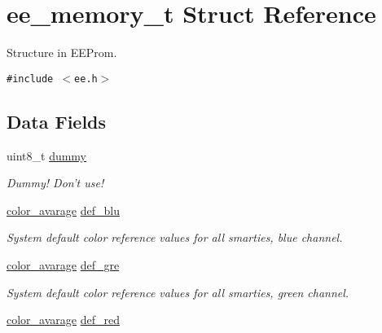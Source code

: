 \hypertarget{structee__memory__t}{
\section{ee\_\-memory\_\-t Struct Reference}
\label{structee__memory__t}
}
Structure in EEProm.  


{\tt \#include $<$ee.h$>$}

\subsection*{Data Fields}
\begin{CompactItemize}
\item 
\hypertarget{structee__memory__t_c1eda51e24a2d4f4e89ee1b89b4f78f6}{
uint8\_\-t \hyperlink{structee__memory__t_c1eda51e24a2d4f4e89ee1b89b4f78f6}{dummy}}
\label{structee__memory__t_c1eda51e24a2d4f4e89ee1b89b4f78f6}

\begin{CompactList}\small\item\em Dummy! Don't use! \item\end{CompactList}\item 
\hypertarget{structee__memory__t_415eb4641ad491d014fc717ba6255734}{
\hyperlink{system_8h_b51ee7141ec54f3e8185d9487af887d5}{color\_\-avarage} \hyperlink{structee__memory__t_415eb4641ad491d014fc717ba6255734}{def\_\-blu}}
\label{structee__memory__t_415eb4641ad491d014fc717ba6255734}

\begin{CompactList}\small\item\em System default color reference values for all smarties, blue channel. \item\end{CompactList}\item 
\hypertarget{structee__memory__t_7159cb0e6d0a5cec77ea5a315fc95da3}{
\hyperlink{system_8h_b51ee7141ec54f3e8185d9487af887d5}{color\_\-avarage} \hyperlink{structee__memory__t_7159cb0e6d0a5cec77ea5a315fc95da3}{def\_\-gre}}
\label{structee__memory__t_7159cb0e6d0a5cec77ea5a315fc95da3}

\begin{CompactList}\small\item\em System default color reference values for all smarties, green channel. \item\end{CompactList}\item 
\hypertarget{structee__memory__t_a7f0e34983d98e32877b654927bbf53b}{
\hyperlink{system_8h_b51ee7141ec54f3e8185d9487af887d5}{color\_\-avarage} \hyperlink{structee__memory__t_a7f0e34983d98e32877b654927bbf53b}{def\_\-red}}
\label{structee__memory__t_a7f0e34983d98e32877b654927bbf53b}


\end{CompactItemize}
